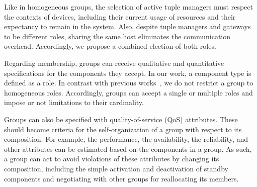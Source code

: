 Like in homogeneous groups, the selection of active tuple managers must respect the contexts of devices, including their current usage of resources and their expectancy to remain in the system. Also, despite tuple managers and gateways to be different roles, sharing the same host eliminates the communication overhead. Accordingly, we propose a combined election of both roles.

Regarding membership, groups can receive qualitative and quantitative specifications for the components they accept. In our work, a component type is defined as a role. In contrast with previous works~\cite{A3}, we do not restrict a group to homogeneous roles. Accordingly, groups can accept a single or multiple roles and impose or not limitations to their cardinality.

Groups can also be specified with quality-of-service (QoS) attributes. These should become criteria for the self-organization of a group with respect to its composition. For example, the performance, the availability, the reliability, and other attributes can be estimated based on the components in a group. As such, a group can act to avoid violations of these attributes by changing its composition, including the simple activation and deactivation of standby components and negotiating with other groups for reallocating its members.


